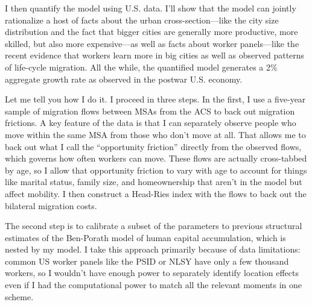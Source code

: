 \documentclass{jmstatement}
\begin{document}
I then quantify the model using U.S. data. I'll show that the model
can jointly rationalize a host of facts about the urban cross-section---like
the city size distribution and the fact that bigger cities are generally
more productive, more skilled, but also more expensive---as well as facts
about worker panels---like the recent evidence that workers learn more
in big cities as well as observed patterns of life-cycle migration. All the
while, the quantified model generates a 2\% aggregate growth rate as observed
in the postwar U.S. economy.

Let me tell you how I do it. I proceed in three steps.
In the first, I use a five-year sample of migration flows between MSAs from the
ACS to back out migration frictions. A key feature of the data is that I can
separately observe people who move within the same MSA from those who don't move
at all. That allows me to back out what I call the ``opportunity friction''
directly from the observed flows, which governs how often workers can move.
These flows are actually cross-tabbed by age, so I allow that opportunity friction
to vary with age to account for things like marital status, family size,
and homeownership that aren't in the model but affect mobility. I then construct
a Head-Ries index with the flows to back out the bilateral migration costs.

The second step is to calibrate a subset of the parameters to previous structural
estimates of the Ben-Porath model of human capital accumulation, which is nested
by my model.
I take this approach primarily because of data limitations: common
US worker panels like the PSID or NLSY have only a few thousand workers, so I
wouldn't have enough power to separately identify location effects even if I
had the computational power to match all the relevant moments in one scheme.
\end{document}
